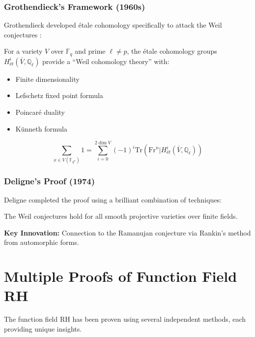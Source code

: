\subsubsection{Grothendieck's Framework (1960s)}

Grothendieck developed étale cohomology specifically to attack the Weil conjectures \cite{grothendieck1965}:

\begin{definition}
For a variety $V$ over $\mathbb{F}_q$ and prime $\ell \neq p$, the étale cohomology groups $H^i_{ét}(\bar{V}, \mathbb{Q}_\ell)$ provide a ``Weil cohomology theory'' with:
\begin{itemize}
\item Finite dimensionality
\item Lefschetz fixed point formula
\item Poincaré duality
\item Künneth formula
\end{itemize}
\end{definition}

\begin{theorem}
\begin{equation}
\sum_{x \in V(\mathbb{F}_{q^n})} 1 = \sum_{i=0}^{2\dim V} (-1)^i \text{Tr}(\text{Fr}^n | H^i_{ét}(\bar{V}, \mathbb{Q}_\ell))
\end{equation}
\end{theorem}

\subsubsection{Deligne's Proof (1974)}

Deligne completed the proof using a brilliant combination of techniques:

\begin{theorem}[Deligne, 1974]
\label{thm:deligne}
The Weil conjectures hold for all smooth projective varieties over finite fields.
\end{theorem}

\textbf{Key Innovation:} Connection to the Ramanujan conjecture via Rankin's method from automorphic forms.

\section{Multiple Proofs of Function Field RH}
\label{sec:multiple_proofs}

The function field RH has been proven using several independent methods, each providing unique insights.

